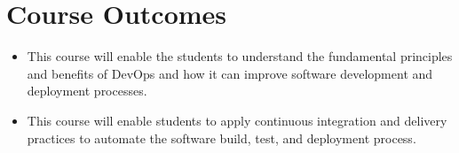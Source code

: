 
\section{Course Outcomes}

\begin{itemize}
\item This course will enable the students to understand the fundamental principles and benefits of DevOps and how it can improve software development and deployment processes.
\item This course will enable students to apply continuous integration and delivery practices to automate the software build, test, and deployment process.
\end{itemize}